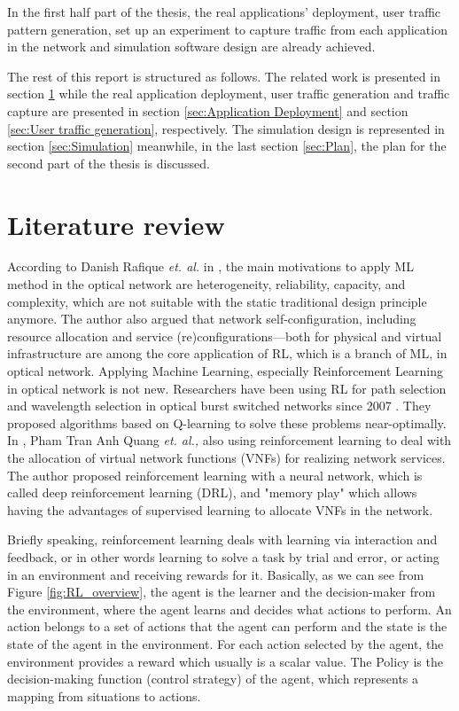 \documentclass[conference]{IEEEtran}
\begin{document}
In the first half part of the thesis, the real applications' deployment, user traffic pattern generation, set up an experiment to capture traffic from each application in the network and simulation software design are already achieved. 

The rest of this report is structured as follows. The related work is presented in section \ref{sec:Literature review} while the real application deployment, user traffic generation and traffic capture are presented in section \ref{sec:Application Deployment} and section \ref{sec:User traffic generation}, respectively. The simulation design is represented in section \ref{sec:Simulation} meanwhile, in the last section \ref{sec:Plan}, the plan for the second part of the thesis is discussed. 


\section{Literature review}
\label{sec:Literature review}

According to Danish Rafique \textit{et. al.} in \cite{Rafique:18}, the main motivations to apply ML method in the optical network are heterogeneity, reliability, capacity, and complexity, which are not suitable with the static traditional design principle anymore. The author also argued that network self-configuration, including resource allocation and service (re)configurations—both for physical and virtual infrastructure are among the core application of RL, which is a branch of ML, in optical network. Applying Machine Learning, especially Reinforcement Learning in optical network is not new. Researchers have been using RL for path selection and wavelength selection in optical burst switched networks since 2007 \cite{4395244}. They proposed algorithms based on Q-learning to solve these problems near-optimally. In \cite{8873660}, Pham Tran Anh Quang \textit{et. al.,} also using reinforcement learning to deal with the allocation of virtual network functions (VNFs) for realizing network services. The author proposed reinforcement learning with a neural network, which is called deep reinforcement learning (DRL), and "memory play" which allows having the advantages of supervised learning to allocate VNFs in the network.

Briefly speaking, reinforcement learning deals with learning via interaction and feedback, or in other words learning to solve a task by trial and error, or acting in an environment and receiving rewards for it. Basically, as we can see from Figure \ref{fig:RL_overview}, the agent is the learner and the decision-maker from the environment, where the agent learns and decides what actions to perform. An action belongs to a set of actions that the agent can perform and the state is the state of the agent in the environment. For each action selected by the agent, the environment provides a reward which usually is a scalar value. The Policy is the decision-making function (control strategy) of the agent, which represents a mapping from situations to actions.
\end{document}
